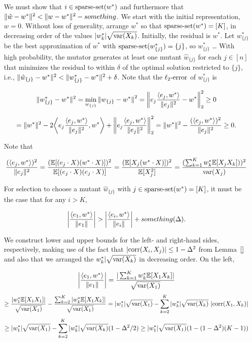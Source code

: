 We must show that $i \in \mathrm{sparse\mbox{-}set}(w^*)$ and furthermore that
$\Vert \hat{w} - w^* \Vert^2 < \Vert w - w^* \Vert^2 - something$.
We start with the initial representation, $w=0$.
Without loss of generality, arrange $w^*$ so that $\mathrm{sparse\mbox{-}set}(w^*) = [K]$,
in decreasing order of the values $\vert w^*_k \vert \sqrt{\mathrm{var}(X_k)}$.
Initially, the residual is $w^*$.
Let $w^*_{\{j\}}$ be the best approximation of $w^*$ with
$\mathrm{sparse\mbox{-}set}(w^*_{\{j\}}) = \{j\}$, so $w^*_{\{j\}}$ \dots
With high probability, the mutator generates at least one mutant
$\hat{w}_{\{j\}}$ for each $j \in [n]$ that minimizes the residual to within
$\delta$ of the optimal solution restricted to $\{j\}$, i.e.,
$\Vert \hat{w}_{\{j\}} - w^* \Vert^2 < \Vert w^*_{\{j\}} - w^* \Vert^2 + \delta$.
Note that the $\mathrm{\ell_2\mbox{-}error}$ of $w^*_{\{j\}}$ is~

\[
\Vert w^*_{\{j\}} - w^* \Vert^2 = \min_{w_{\{j\}}}{\Vert w_{\{j\}} - w^* \Vert}^2
= \bigg \Vert e_j \frac{\langle e_j, w^* \rangle}{\Vert e_j \Vert^2} - w^* \bigg \Vert_2^2 \ge 0
\]

\[
= \Vert w^* \Vert^2 - 2 \bigg \langle e_j \frac{\langle e_j, w^* \rangle}{\Vert e_j \Vert^2}, w^* \bigg \rangle + \bigg \Vert e_j \frac{\langle e_j, w^* \rangle}{\Vert e_j \Vert^2} \bigg \Vert_2^2 
= \Vert w^* \Vert^2 - \frac{(\langle e_j, w^* \rangle)^2}{\Vert e_j \Vert^2} \ge 0.
\]

Note that

\[
\frac{(\langle e_j, w^* \rangle)^2}{\Vert e_j \Vert^2}
= \frac{(\mathbb{E}[(e_j \cdot X)(w^* \cdot X)])^2}{\mathbb{E}[(e_j \cdot X)(e_j \cdot X)]}
= \frac{(\mathbb{E}[X_j (w^* \cdot X)])^2}{\mathbb{E}[X_j^2]}
= \frac{(\sum_{k=1}^K w^*_k \mathbb{E}[X_j X_k]))^2}{\mathrm{var}(X_j)}
\]

For selection to choose a mutant $\hat{w}_{\{j\}}$ with
$j \in \mathrm{sparse\mbox{-}set}(w^*) = [K]$, it must be the case that for any $i > K$,

\[
\bigg\vert \frac{\langle e_1, w^* \rangle}{\Vert e_1 \Vert} \bigg\vert
> \bigg\vert \frac{\langle e_i, w^* \rangle}{\Vert e_i \Vert} \bigg\vert + something(\Delta).
\]

We construct lower and upper bounds for the left- and right-hand sides,
respectively, making use of the fact that
$|\mathrm{corr}(X_i, X_j)| \leq 1 - \Delta^2$ from Lemma~\ref{} and also
that we arranged the $w^*_k \vert \sqrt{\mathrm{var}(X_k)}$ in decreasing order.
On the left,

\[
\bigg\vert \frac{\langle e_1, w^* \rangle}{\Vert e_1 \Vert} \bigg\vert
= \frac{\vert\sum_{k=1}^K w^*_k \mathbb{E}[X_1 X_k]\vert}{\sqrt{\mathrm{var}(X_1)}}
\]
\[
\ge \frac{\vert w^*_1 \mathbb{E}[X_1 X_1]\vert}{\sqrt{\mathrm{var}(X_1)}} - \frac{\sum_{k=2}^K \vert w^*_k \mathbb{E}[X_1 X_k] \vert}{\sqrt{\mathrm{var}(X_1)}}
= \vert w^*_1 \vert \sqrt{\mathrm{var}(X_1)} - \sum_{k=2}^K \vert w^*_k \vert \sqrt{\mathrm{var}(X_k)}~\vert \mathrm{corr}(X_1, X_k) \vert
\]
\[
\ge \vert w^*_1 \vert \sqrt{\mathrm{var}(X_1)} - \sum_{k=2}^K \vert w^*_k \vert \sqrt{\mathrm{var}(X_k)} (1 - \Delta^2/2)
\ge \vert w^*_1 \vert \sqrt{\mathrm{var}(X_1)}(1 - (1 - \Delta^2) (K-1))
\]

